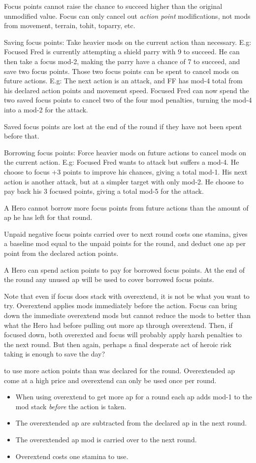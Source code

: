 Focus points cannot raise the chance to succeed higher than the original unmodified value. Focus can only cancel out \emph{action point} modifications, not mods from movement, terrain, tohit, toparry, etc.

Saving focus points: Take heavier mods on the current action than necessary.
E.g: Focused Fred is currently attempting a shield parry with 9 to succeed. He can then take a focus mod-2, making the parry have a chance of 7 to succeed, and save two focus points. Those two focus points can be spent to cancel mods on future actions. E.g: The next action is an attack, and FF has mod-4 total from his declared action points and movement speed. Focused Fred can now spend the two saved focus points to cancel two of the four mod penalties, turning the mod-4 into a mod-2 for the attack.

Saved focus points are lost at the end of the round if they have not been spent before that.

Borrowing focus points: Force heavier mods on future actions to cancel mods on the current action. E.g: Focused Fred wants to attack but suffers a mod-4. He choose to focus +3 points to improve his chances, giving a total mod-1. His next action is another attack, but at a simpler target with only mod-2. He choose to pay back his 3 focused points, giving a total mod-5 for the attack.

A Hero cannot borrow more focus points from future actions than the amount of ap he has left for that round.

Unpaid negative focus points carried over to next round costs one stamina, gives a baseline mod equal to the unpaid points for the round, and deduct one ap per point from the declared action points.

A Hero can spend action points to pay for borrowed focus points. At the end of the round any unused ap will be used to cover borrowed focus points.

Note that even if focus does stack with overextend, it is not be what you want to try. Overextend applies mods immediately before the action. Focus can bring down the immediate overextend mods but cannot reduce the mods to better than what the Hero had before pulling out more ap through overextend. Then, if focused down, both overexted and focus will probably apply harsh penalties to the next round. But then again, perhaps a final desperate act of heroic risk taking is enough to save the day?


 to use more action points than was declared for the round. Overextended ap come at a high price and overextend can only be used once per round.
\begin{itemize}
    \item When using overextend to get more ap for a round each ap adds mod-1 to the mod stack \emph{before} the action is taken.
    \item The overextended ap are subtracted from the declared ap in the next round.
    \item The overextended ap mod is carried over to the next round.
    \item Overextend costs one stamina to use.
\end{itemize}

